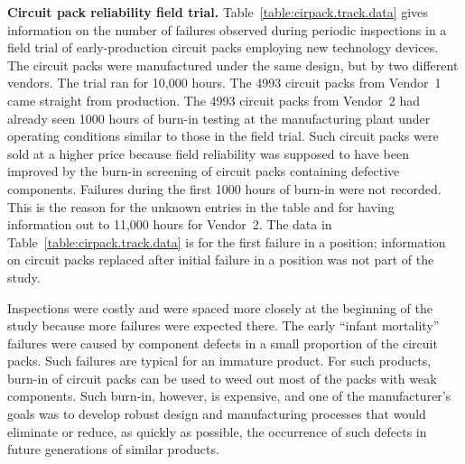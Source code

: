 \begin{example}
\label{example:electronic.subsystem.data}
{\bf Circuit pack reliability field trial.}
Table~\ref{table:cirpack.track.data} gives information on the number
of failures observed during periodic inspections in a field trial of
early-production circuit packs employing new technology devices.  The
circuit packs were manufactured under the same design, but by two
different vendors. The trial ran for 10,000 hours. The 4993 circuit
packs from Vendor~1 came straight from production.  The 4993 circuit
packs from Vendor~2 had already seen 1000 hours of burn-in testing at
the manufacturing plant under operating conditions similar to those in
the field trial. Such circuit packs were sold at a higher price
because field reliability was supposed to have been improved by the
burn-in screening of circuit packs containing defective components.
Failures during the first 1000 hours of burn-in were not recorded.
This is the reason for the unknown entries in the table and for having
information out to 11,000 hours for Vendor~2.  The data in
Table~\ref{table:cirpack.track.data} is for the first failure in a
position; information on circuit packs replaced after initial failure
in a position was not part of the study.

Inspections were costly and were spaced more closely at the beginning
of the study because more failures were expected there.  The early
``infant mortality'' failures were caused by component defects in a
small proportion of the circuit packs.  Such failures are typical for
an immature product. For such products, burn-in of circuit packs can
be used to weed out most of the packs with weak components.  Such
burn-in, however, is expensive, and one of the manufacturer's goals
was to develop robust design and manufacturing processes that would
eliminate or reduce, as quickly as possible, the occurrence of such
defects in future generations of similar products.


\end{example}
